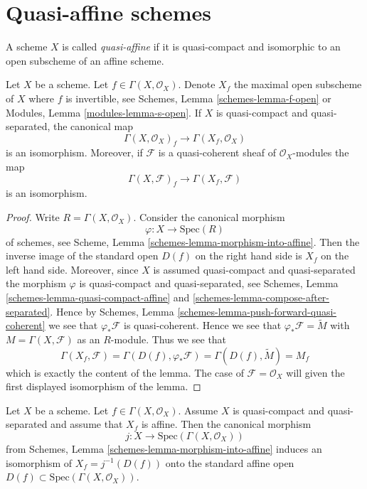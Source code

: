 \section{Quasi-affine schemes}
\label{section-quasi-affine}

\begin{definition}
\label{definition-quasi-affine}
A scheme $X$ is called {\it quasi-affine} if it is quasi-compact
and isomorphic to an open subscheme of an affine scheme.
\end{definition}

\begin{lemma}
\label{lemma-invert-f-sections}
Let $X$ be a scheme. Let $f \in \Gamma(X, \mathcal{O}_X)$.
Denote $X_f$ the maximal open subscheme of $X$ where $f$ is invertible, see
Schemes, Lemma \ref{schemes-lemma-f-open} or
Modules, Lemma \ref{modules-lemma-s-open}.
If $X$ is quasi-compact and quasi-separated, the canonical map
$$
\Gamma(X, \mathcal{O}_X)_f \longrightarrow \Gamma(X_f, \mathcal{O}_X)
$$
is an isomorphism. Moreover, if $\mathcal{F}$ is a quasi-coherent
sheaf of $\mathcal{O}_X$-modules the map
$$
\Gamma(X, \mathcal{F})_f \longrightarrow \Gamma(X_f, \mathcal{F})
$$
is an isomorphism.
\end{lemma}

\begin{proof}
Write $R = \Gamma(X, \mathcal{O}_X)$.
Consider the canonical morphism
$$
\varphi : X \longrightarrow \text{Spec}(R)
$$
of schemes, see
Scheme, Lemma \ref{schemes-lemma-morphism-into-affine}.
Then the inverse image of the standard open $D(f)$ on the
right hand side is $X_f$ on the left hand side.
Moreover, since $X$ is assumed quasi-compact and quasi-separated
the morphism $\varphi$ is quasi-compact and quasi-separated,
see Schemes, Lemma \ref{schemes-lemma-quasi-compact-affine} and
\ref{schemes-lemma-compose-after-separated}. Hence by
Schemes, Lemma \ref{schemes-lemma-push-forward-quasi-coherent}
we see that $\varphi_*\mathcal{F}$ is quasi-coherent.
Hence we see that $\varphi_*\mathcal{F} = \widetilde M$
with $M = \Gamma(X, \mathcal{F})$ as an $R$-module.
Thus we see that
$$
\Gamma(X_f, \mathcal{F}) =
\Gamma(D(f), \varphi_*\mathcal{F}) =
\Gamma(D(f), \widetilde M) = M_f
$$
which is exactly the content of the lemma. The case of
$\mathcal{F} = \mathcal{O}_X$ will given the first displayed isomorphism
of the lemma.
\end{proof}

\begin{lemma}
\label{lemma-invert-f-affine}
Let $X$ be a scheme. Let $f \in \Gamma(X, \mathcal{O}_X)$.
Assume $X$ is quasi-compact and quasi-separated and assume that
$X_f$ is affine. Then the canonical morphism
$$
j : X \longrightarrow \text{Spec}(\Gamma(X, \mathcal{O}_X))
$$
from Schemes, Lemma \ref{schemes-lemma-morphism-into-affine}
induces an isomorphism of $X_f = j^{-1}(D(f))$ onto the standard affine
open $D(f) \subset \text{Spec}(\Gamma(X, \mathcal{O}_X))$.
\end{lemma}


